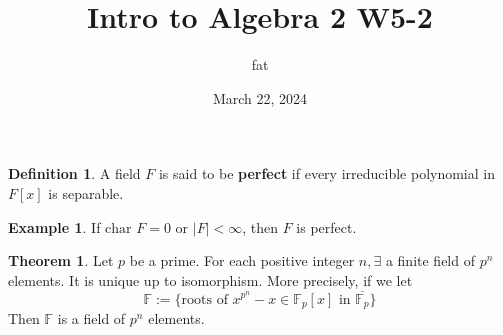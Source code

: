 \documentclass{article}
\title{Intro to Algebra 2 W5-2}
\author{fat}
\date{March 22, 2024}
\theoremstyle{definition}
\newtheorem{thm}{Theorem}
\newtheorem{ex}{Example}
\newtheorem{dfn}{Definition}
\begin{document}
\maketitle
\thispagestyle{fancy}
\renewcommand{\footrulewidth}{0.4pt}
\cfoot{\thepage}
\renewcommand{\headrulewidth}{0.4pt}

\begin{dfn}
	A field $F$ is said to be \textbf{perfect} if every irreducible polynomial in $F[x]$ is separable.
\end{dfn}

\begin{ex}
	If $\text{char } F = 0$ or $|F| < \infty$, then $F$ is perfect.
\end{ex}

\begin{thm}
	Let $p$ be a prime.
	For each positive integer $n, \exists$ a finite field of $p^n$ elements.
	It is unique up to isomorphism.
	More precisely, if we let 
	\[
		\mathbb{F} := \{ \text{roots of } x^{p^n} - x \in \mathbb{F}_p[x] \text{ in } \overline{\mathbb{F}_p} \}
	\]
	Then $\mathbb{F}$ is a field of $p^n$ elements.
\end{thm}
\end{document}
